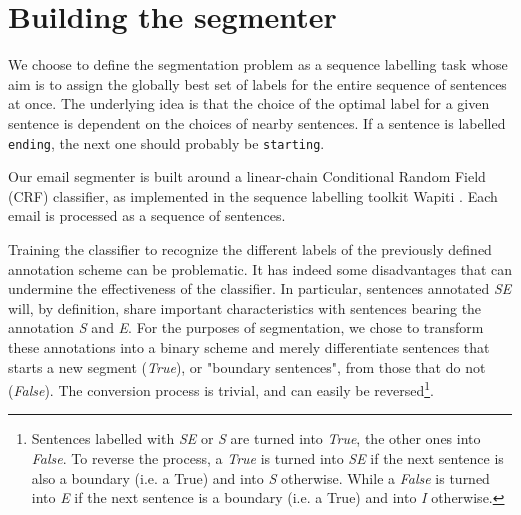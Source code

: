 
\section{Building the segmenter}
\label{sec:buildingTheSegmenter}
We choose to define the segmentation problem as a sequence labelling task whose aim is to assign the globally best set of labels for the entire sequence of sentences at once. The underlying idea is that the choice of the optimal label for a given sentence is dependent on the choices of nearby sentences. If a sentence is labelled \texttt{\footnotesize ending}, the next one should probably be  \texttt{\footnotesize starting}.


Our email segmenter is built around a linear-chain Conditional Random Field (CRF) classifier, as implemented in the sequence labelling toolkit Wapiti \cite{lavergne2010practical}. Each email is processed as a sequence of sentences.

Training the classifier to recognize the different labels of the previously defined annotation scheme can be problematic. It has indeed some disadvantages that can undermine the effectiveness of the classifier. In particular, sentences annotated \textit{SE} will, by definition, share important characteristics with sentences bearing the annotation \textit{S} and \textit{E}. For the purposes of segmentation, we chose to transform these annotations into a binary scheme and merely differentiate sentences that starts a new segment (\textit{True}), or "boundary sentences", from those that do not (\textit{False}). The conversion process is trivial, and can easily be reversed\footnote{Sentences labelled with \textit{SE} or \textit{S} are turned into \textit{True}, the other ones into \textit{False}. To reverse the process, a \textit{True} is turned into \textit{SE} if the next sentence is also a boundary (i.e. a True) and into \textit{S} otherwise. While a \textit{False} is turned into \textit{E} if the next sentence is a boundary (i.e. a True) and into  \textit{I} otherwise.}.

